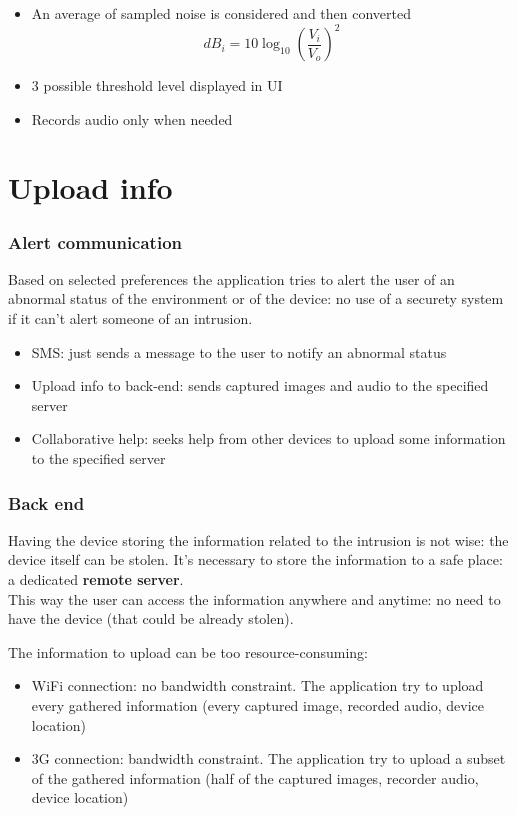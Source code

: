 \documentclass{beamer}
\begin{document}
\begin{frame}
\begin{minipage}[c]{.25\textwidth}
\end{minipage}\begin{minipage}[c]{.65\textwidth}
\begin{itemize}
  \item An average of sampled noise is considered and then converted
    {\footnotesize\[dB_i = 10\log_{10} \left(\frac{V_i}{V_o}\right)^2\]}
  \item 3 possible threshold level displayed in UI
  \item Records audio only when needed
\end{itemize}
\end{minipage}
\end{frame}


\section{Upload info}
\begin{frame}
\frametitle{Alert communication}
\begin{block}{}
Based on selected preferences the application tries to alert the user of an abnormal status of the environment or of the device: no use of a securety system if it can't alert someone of an intrusion.
\end{block}
\begin{itemize}
  \item SMS: just sends a message to the user to notify an abnormal status
  \item Upload info to back-end: sends captured images and audio to the specified server
  \item Collaborative help: seeks help from other devices to upload some information to the specified server
\end{itemize}
\end{frame}

\begin{frame}
\frametitle{Back end}
\begin{block}{}
Having the device storing the information related to the intrusion is not wise: the device itself can be stolen. It's necessary to store the information to a safe place: a dedicated \textbf{remote server}.\\This way the user can access the information anywhere and anytime: no need to have the device (that could be already stolen).
\end{block}
The information to upload can be too resource-consuming:
\begin{itemize}
  \item WiFi connection: no bandwidth constraint. The application try to upload every gathered information (every captured image, recorded audio, device location)
  \item 3G connection: bandwidth constraint. The application try to upload a subset of the gathered information (half of the captured images, recorder audio, device location)
\end{itemize}
\end{frame}
\end{document}
